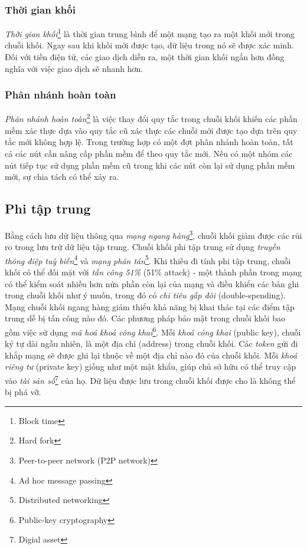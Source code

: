 \subsubsection{Thời gian khối}
\textit{Thời gian khối}\footnote{Block time} là thời gian trung bình để một mạng tạo ra một khối mới trong chuỗi khối. Ngay sau khi khối mới được tạo, dữ liệu trong nó sẽ được xác minh. Đối với tiền điện tử, các giao dịch diễn ra, một thời gian khối ngắn hơn đồng nghĩa với việc giao dịch sẽ nhanh hơn.

\subsubsection{Phân nhánh hoàn toàn}
\textit{Phân nhánh hoàn toàn}\footnote{Hard fork} là việc thay đổi quy tắc trong chuỗi khối khiến các phần mềm xác thực dựa vào quy tắc cũ xác thực các chuỗi mới được tạo dựa trên quy tắc mới không hợp lệ. Trong trường hợp có một đợt phân nhánh hoàn toàn, tất cả các nút cần nâng cấp phần mềm để theo quy tắc mới. Nếu có một nhóm các nút tiếp tục sử dụng phần mềm cũ trong khi các nút còn lại sử dụng phần mềm mới, sự chia tách có thể xảy ra.


\subsection{Phi tập trung}

Bằng cách lưu dữ liệu thông qua \textit{mạng ngang hàng}\footnote{Peer-to-peer network (P2P network)}, chuỗi khối giảm được các rủi ro trong lưu trữ dữ liệu tập trung. Chuỗi khối phi tập trung sử dụng \textit{truyền thông điệp tuỳ biến}\footnote{Ad hoc message passing} và \textit{mạng phân tán}\footnote{Distributed networking}. Khi thiếu đi tính phi tập trung, chuỗi khối có thể đối mặt với \textit{tấn công 51\%} (51\% attack) - một thành phần trong mạng có thể kiểm soát nhiều hơn nửa phần còn lại của mạng và điều khiển các bản ghi trong chuỗi khối như ý muốn, trong đó có \textit{chi tiêu gấp đôi} (double-spending).\\

Mạng chuỗi khối ngang hàng giảm thiểu khả năng bị khai thác tại các điểm tập trung dễ bị tấn công nào đó. Các phương pháp bảo mật trong chuỗi khối bao gồm việc sử dụng \textit{mã hoá khoá công khai}\footnote{Public-key cryptography}. Mỗi \textit{khoá công khai} (public key), chuỗi ký tự dài ngẫu nhiên, là một địa chỉ (address) trong chuỗi khối. Các \textit{token} gửi đi khắp mạng sẽ được ghi lại thuộc về một địa chỉ nào đó của chuỗi khối. Mỗi \textit{khoá riêng tư} (private key) giống như một mật khẩu, giúp chủ sở hữu có thể truy cập vào \textit{tài sản số}\footnote{Digial asset} của họ. Dữ liệu được lưu trong chuỗi khối được cho là không thể bị phá vỡ.\\

